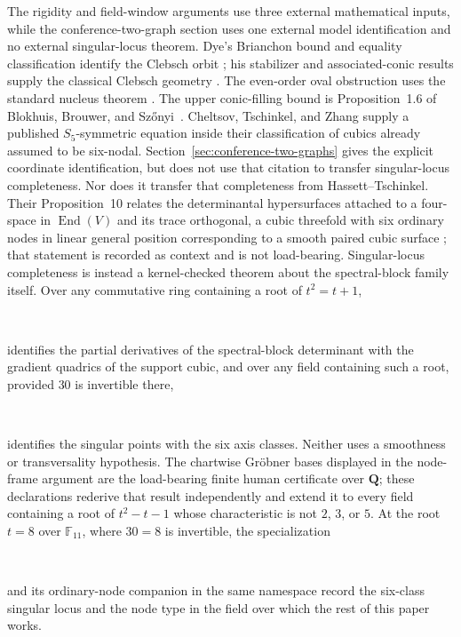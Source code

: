 \documentclass[11pt]{article}
\theoremstyle{definition}
\theoremstyle{remark}
\newcommand{\F}{\mathbb{F}}
\begin{document}
The rigidity and field-window arguments use three external mathematical
inputs, while the conference-two-graph section uses one external model
identification and no external singular-locus theorem. Dye's Brianchon bound and equality classification identify
the Clebsch orbit
\cite[\S2.2--2.3, Theorem~1, pp.~275--276]{Dye1991}; his stabilizer and
associated-conic results supply the classical Clebsch geometry
\cite[Theorems~2--3, pp.~276--278]{Dye1991}.  The even-order oval
obstruction uses the standard nucleus theorem
\cite[p.~177]{Hirschfeld1998}.  The upper conic-filling bound is
Proposition~1.6 of Blokhuis, Brouwer, and Sz\H{o}nyi~\cite{BBS2010}.
Cheltsov, Tschinkel, and Zhang supply a published $S_5$-symmetric equation
inside their classification of cubics already assumed to be six-nodal.
Section~\ref{sec:conference-two-graphs} gives the explicit coordinate
identification, but does not use that citation to transfer singular-locus
completeness.  Nor does it transfer that completeness from
Hassett--Tschinkel.  Their Proposition~10 relates the determinantal
hypersurfaces attached to a four-space in $\operatorname{End}(V)$ and its
trace orthogonal, a cubic threefold with six ordinary nodes in linear
general position corresponding to a smooth paired cubic surface
\cite[\S3, Proposition~10]{HassettTschinkel2010}; that statement is
recorded as context and is not load-bearing.  Singular-locus completeness
is instead a kernel-checked theorem about the spectral-block family itself.
Over any commutative ring containing a root of $t^2=t+1$,
\begin{center}
\small{}\\
\small{}
\end{center}
identifies the partial derivatives of the spectral-block determinant with the
gradient quadrics of the support cubic, and over any field containing such
a root, provided $30$ is invertible there,
\begin{center}
\small{}\\
\small{}
\end{center}
identifies the singular points with the six axis classes.  Neither uses a
smoothness or transversality hypothesis. The chartwise Gr\"obner bases
displayed in the node-frame argument are the load-bearing finite human
certificate over $\mathbf Q$; these declarations rederive that result
independently and extend it to every field containing a root of $t^2-t-1$
whose characteristic is not $2$, $3$, or $5$.  At the root $t=8$ over
$\F_{11}$, where $30=8$ is invertible, the specialization
\begin{center}
\small{}\\
\small{}
\end{center}
and its ordinary-node companion in the same namespace record the six-class
singular locus and the node type in the field over which the rest of this
paper works.
\end{document}
